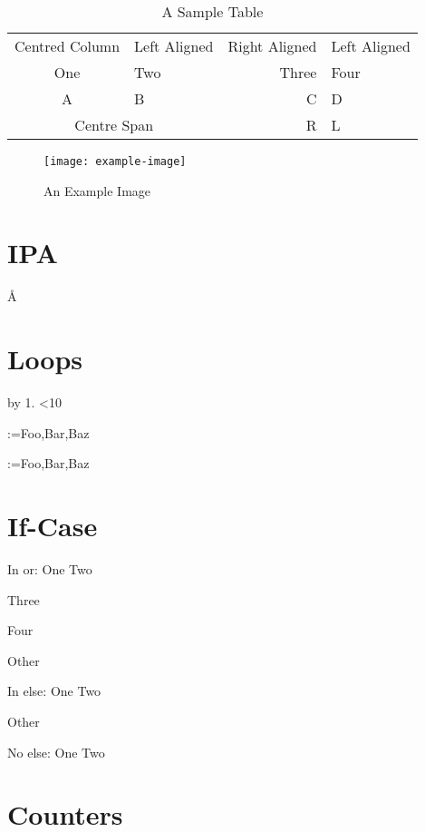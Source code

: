 \documentclass{article}
\begin{document}
\begin{table}[htbp] \caption{A Sample Table} 
\label{tab:sample} \centering


\begin{tabular}{clrl} Centred Column &Left Aligned &Right Aligned &Left Aligned\\ One &Two &Three &Four\\ A &B &C &D\\ \multicolumn{2}{|c|}{Centre Span} &R &L 
\end{tabular} 
\end{table} 


\begin{figure}[htbp] \centering


\texttt{[image: example-image]} \caption{An Example Image} 
\label{fig:sample} 
\end{figure} 


\section{IPA}
\label{sec:ipa}  \AA {} \textschwa


\section{Loops} 

\newcount\myctr \loop

\advance\myctr by 1\relax \the\myctr. \ifnum\myctr<10 \repeat

\makeatletter

\@for\tmp:=Foo,Bar,Baz 

\def\tmplist{Foo,Bar,Baz} \@for\tmp:=\tmplist{} \makeatother


\section{If-Case} 

\relax In or: \ifcase\myctr One \or Two \or

Three \or

%
Four \else

%
Other \fi

%
In else: \ifcase\myctr One \or Two \else

Other \fi

%
No else: \ifcase\myctr One \or Two \fi


\section{Counters} 
\end{document}
